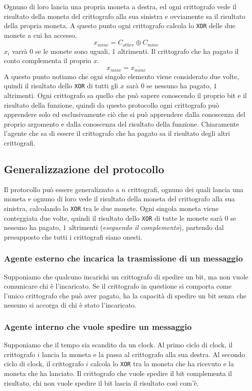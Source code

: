 Ognuno di loro lancia una propria moneta a destra, ed ogni crittografo vede il risultato della
moneta del crittografo alla sua sinistra e ovviamente sa il risultato della propria moneta.
A questo punto ogni crittografo calcola lo \texttt{XOR} delle due monete a cui ha accesso.
\[
  x_{mine} = C_{other} \oplus C_{mine}
\]
$x_i$ varrà $0$ se le monete sono uguali, $1$ altrimenti. Il crittografo che ha pagato il conto 
complementa il proprio $x$.
\[
  x_{mine} = \overline{x_{mine}}
\]
A questo punto notiamo che ogni singolo elemento viene considerato due volte, quindi il risultato
dello \texttt{XOR} di tutti gli $x$ sarà $0$ se nessuno ha pagato, $1$ altrimenti. 
Ogni crittografo sa quello che può sapere conoscendo il proprio bit e il risultato della funzione, 
quindi da questo protocollo ogni crittografo può apprendere solo ed esclusivamente ciò che si può apprendere 
dalla conoscenza del proprio argomento e dalla conoscenza del risultato della funzione.
Chiaramente l'agente che sa di essere il crittografo che ha pagato sa il risultato degli altri 
crittografi.
\subsection{Generalizzazione del protocollo}
Il protocollo può essere generalizzato a \(n\) crittografi, ognuno dei quali lancia una moneta e
ognuno di loro vede il risultato della moneta del crittografo alla sua sinistra, calcolando 
lo \texttt{XOR} tra le due monete. Ogni singola moneta viene conteggiata due volte, quindi
il risultato dello \texttt{XOR} di tutte le monete sarà \(0\) se nessuno ha pagato, \(1\) altrimenti
(\textit{eseguendo il complemento}), partendo dal presupposto che tutti i crittografi siano onesti.

\subsubsection{Agente esterno che incarica la trasmissione di un messaggio}
Supponiamo che qualcuno incarichi un crittografo di spedire un bit, ma non vuole comunicare 
chi è l'incaricato. Se il crittografo in questione si comporta come l'unico crittografo che 
può aver pagato, ha la capacità di spedire un bit senza che nessuno si accorga di chi è
stato l'incaricato.

\subsubsection{Agente interno che vuole spedire un messaggio}
Supponiamo che il tempo sia scandito da un clock. Al primo ciclo di clock, il crittografo \(i\) lancia la
moneta e la passa al crittografo alla sua destra. Al secondo ciclo di clock, il crittografo \(i\) calcola 
lo \texttt{XOR} tra la moneta che ha ricevuto e la moneta che ha lanciato. Il crittografo 
che vuole spedire il bit complementa il risultato, chi non vuole spedire il
bit lascia il risultato così com'è. 

